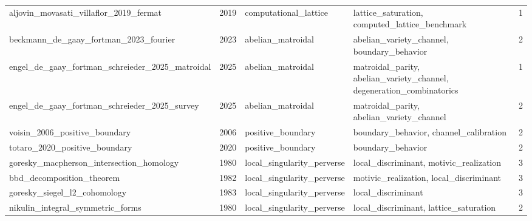 \begin{table}[h]
\begin{tabular}{|p{}|p{}|p{}|p{}|p{}|}
aljovin\_\allowbreak{}movasati\_\allowbreak{}villaflor\_\allowbreak{}2019\_\allowbreak{}fermat & 2019 & computational\_\allowbreak{}lattice & lattice\_\allowbreak{}saturation, computed\_\allowbreak{}lattice\_\allowbreak{}benchmark & 1 \\
beckmann\_\allowbreak{}de\_\allowbreak{}gaay\_\allowbreak{}fortman\_\allowbreak{}2023\_\allowbreak{}fourier & 2023 & abelian\_\allowbreak{}matroidal & abelian\_\allowbreak{}variety\_\allowbreak{}channel, boundary\_\allowbreak{}behavior & 2 \\
engel\_\allowbreak{}de\_\allowbreak{}gaay\_\allowbreak{}fortman\_\allowbreak{}schreieder\_\allowbreak{}2025\_\allowbreak{}matroidal & 2025 & abelian\_\allowbreak{}matroidal & matroidal\_\allowbreak{}parity, abelian\_\allowbreak{}variety\_\allowbreak{}channel, degeneration\_\allowbreak{}combinatorics & 1 \\
engel\_\allowbreak{}de\_\allowbreak{}gaay\_\allowbreak{}fortman\_\allowbreak{}schreieder\_\allowbreak{}2025\_\allowbreak{}survey & 2025 & abelian\_\allowbreak{}matroidal & matroidal\_\allowbreak{}parity, abelian\_\allowbreak{}variety\_\allowbreak{}channel & 2 \\
voisin\_\allowbreak{}2006\_\allowbreak{}positive\_\allowbreak{}boundary & 2006 & positive\_\allowbreak{}boundary & boundary\_\allowbreak{}behavior, channel\_\allowbreak{}calibration & 2 \\
totaro\_\allowbreak{}2020\_\allowbreak{}positive\_\allowbreak{}boundary & 2020 & positive\_\allowbreak{}boundary & boundary\_\allowbreak{}behavior & 2 \\
goresky\_\allowbreak{}macpherson\_\allowbreak{}intersection\_\allowbreak{}homology & 1980 & local\_\allowbreak{}singularity\_\allowbreak{}perverse & local\_\allowbreak{}discriminant, motivic\_\allowbreak{}realization & 3 \\
bbd\_\allowbreak{}decomposition\_\allowbreak{}theorem & 1982 & local\_\allowbreak{}singularity\_\allowbreak{}perverse & motivic\_\allowbreak{}realization, local\_\allowbreak{}discriminant & 3 \\
goresky\_\allowbreak{}siegel\_\allowbreak{}l2\_\allowbreak{}cohomology & 1983 & local\_\allowbreak{}singularity\_\allowbreak{}perverse & local\_\allowbreak{}discriminant & 3 \\
nikulin\_\allowbreak{}integral\_\allowbreak{}symmetric\_\allowbreak{}forms & 1980 & local\_\allowbreak{}singularity\_\allowbreak{}perverse & local\_\allowbreak{}discriminant, lattice\_\allowbreak{}saturation & 2 \\

\end{tabular}
\end{table}
